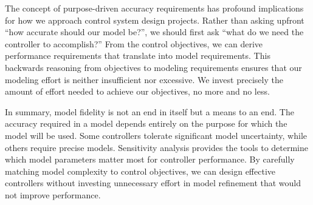 The concept of purpose-driven accuracy requirements has profound implications for how we approach control system design projects. Rather than asking upfront ``how accurate should our model be?'', we should first ask ``what do we need the controller to accomplish?'' From the control objectives, we can derive performance requirements that translate into model requirements. This backwards reasoning from objectives to modeling requirements ensures that our modeling effort is neither insufficient nor excessive. We invest precisely the amount of effort needed to achieve our objectives, no more and no less.

In summary, model fidelity is not an end in itself but a means to an end. The accuracy required in a model depends entirely on the purpose for which the model will be used. Some controllers tolerate significant model uncertainty, while others require precise models. Sensitivity analysis provides the tools to determine which model parameters matter most for controller performance. By carefully matching model complexity to control objectives, we can design effective controllers without investing unnecessary effort in model refinement that would not improve performance.